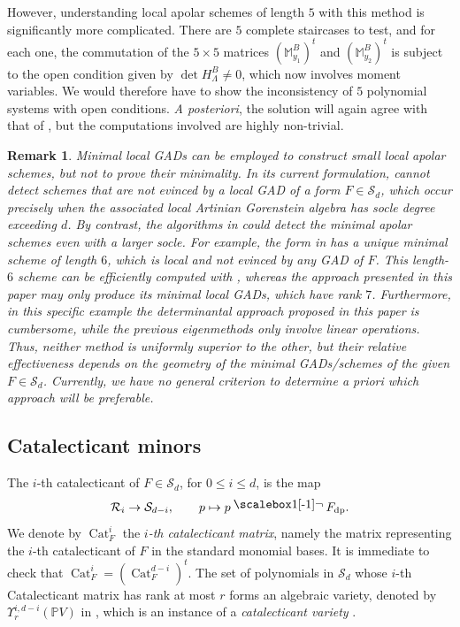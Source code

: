 \documentclass{amsart}
\theoremstyle{plain}
\newtheorem{remark}[remark]{Remark}
\renewcommand{\S}{\mathcal{S}}
\newcommand{\contract}{\mathbin{\mathpalette\dointprod\relax}}
\newcommand{\dointprod}[2]{%
  \raisebox{\depth}{\scalebox{1}[-1]{$#1\lnot$}}}
\def\R{\mathcal{R}}
\numberwithin{equation}{section}
\begin{document}
However, understanding local apolar schemes of length $5$ with this method is significantly more complicated.
There are $5$ complete staircases to test, and for each one, the commutation of the $5\times 5$ matrices $(\mathbb{M}_{y_1}^B)^t$ and $(\mathbb{M}_{y_2}^B)^t$ is subject to the open condition given by $\det H_\Lambda^B\neq 0$, which now involves moment variables.
We would therefore have to show the inconsistency of $5$ polynomial systems with open conditions.
\emph{A posteriori}, the solution will again agree with that of , but the computations involved are highly non-trivial.

\begin{remark}
    Minimal local GADs can be employed to construct small local apolar schemes, but not to prove their minimality.
    In its current formulation,  cannot detect schemes that are not evinced by a local GAD of a form $F \in \S_d$, which occur precisely when the associated local Artinian Gorenstein algebra has socle degree exceeding $d$.
    By contrast, the algorithms in \cite{BF25, BT20} could detect the minimal apolar schemes even with a larger socle.
    For example, the form in \cite[Example 4.6]{BOT24} has a unique minimal scheme of length $6$, which is local and not evinced by any GAD of $F$.
    This length-$6$ scheme can be efficiently computed with \cite{BF25, BT20}, whereas the approach presented in this paper may only produce its minimal local GADs, which have rank $7$.
    Furthermore, in this specific example the determinantal approach proposed in this paper is cumbersome, while the previous eigenmethods \cite{BF25, BT20} only involve linear operations.
    Thus, neither method is uniformly superior to the other, but their relative effectiveness depends on the geometry of the minimal GADs/schemes of the given $F \in \S_d$.
    Currently, we have no general criterion to determine a priori which approach will be preferable.
\end{remark}


\subsection{Catalecticant minors} \label{subsec:catalecticant}
The $i$-th catalecticant of $F\in \S_d$, for $0 \leq i \leq d$, is the map
\[ \R_i\to \S_{d-i}, \qquad p \mapsto p\contract F_{\rm dp}. \]
We denote by $\operatorname{Cat}_F^{i}$ the \emph{$i$-th catalecticant matrix}, namely the matrix representing the $i$-th catalecticant of $F$ in the standard monomial bases.
It is immediate to check that $\operatorname{Cat}_F^{i}=(\operatorname{Cat}_F^{d-i})^t$.
The set of polynomials in $\S_d$ whose $i$-th Catalecticant matrix has rank at most $r$ forms an algebraic variety, denoted by $\varUpsilon^{i, d-i}_r(\mathbb PV)$ in \cite{BB14}, which is an instance of a \emph{catalecticant variety} \cite[Def. 1.4]{IK99}. 
\end{document}
